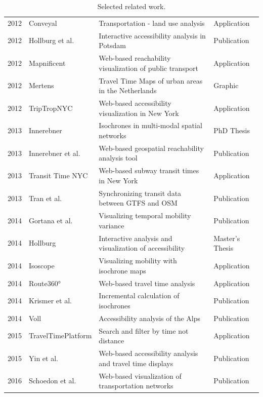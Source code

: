 \begin{table}[htp]
\begin{tabular}{r|l|l|l}
      2012 & Conveyal \cite{Conveyal} & Transportation - land use analysis  & Application  \\
      2012 & Hollburg et al. \cite{hollburghier} & Interactive accessibility analysis in Potsdam & Publication  \\
      2012 & Mapnificent \cite{Mapnificent}  & Web-based reachability visualization of public transport  & Application  \\
      2012 & Mertens \cite{meertens2012} & Travel Time Maps of urban areas in the Netherlands  & Graphic  \\
      2012 & TripTropNYC \cite{TriptropNYC} & Web-based accessibility visualization in New York  & Application  \\
      2013 & Innerebner \cite{Innerebner2013} & Isochrones in multi-modal spatial networks  & PhD Thesis  \\
      2013 & Innerebner et al. \cite{innerebner2013isoga} & Web-based geospatial reachability analysis tool  & Publication  \\
      2013 & Transit Time NYC \cite{TransitTimeNYC} & Web-based subway transit times in New York & Application \\
      2013 & Tran et al. \cite{tran2013go_sync} & Synchronizing transit data between GTFS and OSM  & Publication  \\
      2014 & Gortana et al. \cite{gortanaisoscope} & Visualizing temporal mobility variance  & Publication  \\
      2014 & Hollburg \cite{Hollburg2014} & Interactive analysis and visualization of accessibility & Master's Thesis  \\
      2014 & Isoscope \cite{Isoscope} & Visualizing mobility with isochrone maps  & Application  \\
      2014 & Route360° \cite{Route360} & Web-based travel time analysis  & Application  \\
      2014 & Krismer et al. \cite{krismer2014incremental} & Incremental calculation of isochrones  & Publication  \\
      2014 & Voll \cite{vollerreichbarkeiten} & Accessibility analysis of the Alps  & Publication  \\
      2015 & TravelTimePlatform \cite{TravelTimePlatform} & Search and filter by time not distance  & Application  \\
      2015 & Yin et al. \cite{Yin2015} & Web-based accessibility analysis and travel time displays  & Publication  \\
      2016 & Schoedon et al. \cite{STHD2016} & Web-based visualization of transportation networks  & Publication  \\
    \end{tabular}
    \caption{Selected related work.}
    \label{tab:overv:relat}
  \end{table}


